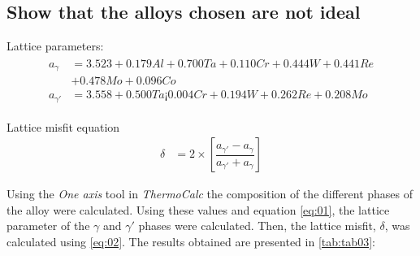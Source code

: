 \clearpage
\section{}

\subsection{Show that the alloys chosen are not ideal}

Lattice parameters:
\begin{align}
  \label{eq:01}
    \begin{split}
        a_\gamma &= 3.523 + 0.179 Al + 0.700Ta + 0.110 Cr + 0.444W+ 0.441 Re \\
        & + 0.478Mo + 0.096 Co \\
        a_{\gamma'} &= 3.558 + 0.500Ta ¡ 0.004 Cr + 0.194W+ 0.262 Re + 0.208Mo
    \end{split}
\end{align}

Lattice misfit equation
\begin{align}
  \label{eq:02}
    \delta &= 2\times\left[\dfrac{a_{\gamma'}-a_\gamma}{a_{\gamma'}+a_\gamma}\right]
\end{align}

Using the \textit{One axis} tool in \textit{ThermoCalc} the composition of the different phases of the alloy were calculated. Using these values and equation \ref{eq:01}, the lattice parameter of the $\gamma$ and $\gamma'$ phases were calculated. Then, the lattice misfit, $\delta$, was calculated using \ref{eq:02}. The results obtained are presented in \ref{tab:tab03}:

